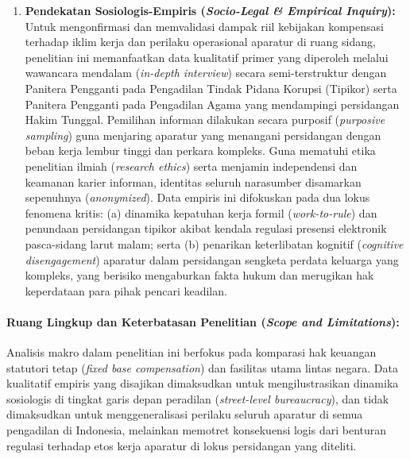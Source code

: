 \documentclass[12pt, a4paper]{article}
\begin{document}
\begin{enumerate}
    \item \textbf{Pendekatan Sosiologis-Empiris (\textit{Socio-Legal \& Empirical Inquiry}):} Untuk mengonfirmasi dan memvalidasi dampak riil kebijakan kompensasi terhadap iklim kerja dan perilaku operasional aparatur di ruang sidang, penelitian ini memanfaatkan data kualitatif primer yang diperoleh melalui wawancara mendalam (\textit{in-depth interview}) secara semi-terstruktur dengan Panitera Pengganti pada Pengadilan Tindak Pidana Korupsi (Tipikor) serta Panitera Pengganti pada Pengadilan Agama yang mendampingi persidangan Hakim Tunggal. Pemilihan informan dilakukan secara purposif (\textit{purposive sampling}) guna menjaring aparatur yang menangani persidangan dengan beban kerja lembur tinggi dan perkara kompleks. Guna mematuhi etika penelitian ilmiah (\textit{research ethics}) serta menjamin independensi dan keamanan karier informan, identitas seluruh narasumber disamarkan sepenuhnya (\textit{anonymized}). Data empiris ini difokuskan pada dua lokus fenomena kritis: (a) dinamika kepatuhan kerja formil (\textit{work-to-rule}) dan penundaan persidangan tipikor akibat kendala regulasi presensi elektronik pasca-sidang larut malam; serta (b) penarikan keterlibatan kognitif (\textit{cognitive disengagement}) aparatur dalam persidangan sengketa perdata keluarga yang kompleks, yang berisiko mengaburkan fakta hukum dan merugikan hak keperdataan para pihak pencari keadilan.
\end{enumerate}

\paragraph{Ruang Lingkup dan Keterbatasan Penelitian (\textit{Scope and Limitations}):} Analisis makro dalam penelitian ini berfokus pada komparasi hak keuangan statutori tetap (\textit{fixed base compensation}) dan fasilitas utama lintas negara. Data kualitatif empiris yang disajikan dimaksudkan untuk mengilustrasikan dinamika sosiologis di tingkat garis depan peradilan (\textit{street-level bureaucracy}), dan tidak dimaksudkan untuk menggeneralisasi perilaku seluruh aparatur di semua pengadilan di Indonesia, melainkan memotret konsekuensi logis dari benturan regulasi terhadap etos kerja aparatur di lokus persidangan yang diteliti.
\end{document}

